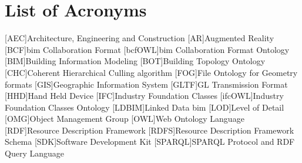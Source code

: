 \documentclass[12pt,a4paper,faculty=ea,language=en,doctype=report]{ugent-doc}
\renewcommand{\ULthickness}{2pt} %
\begin{document}
\maketitle
\renewcommand{\ULthickness}{1pt}

{\hypersetup{hidelinks}
  \tableofcontents
  \listoffigures
}

\newpage









% 
\clearpage
\chapter*{List of Acronyms}
\begin{acronym}[JSONP]\itemsep2pt\hypersetup{hidelinks}
  [AEC]{Architecture, Engineering and Construction}
  [AR]{Augmented Reality}
  [BCF]{\acs{bim} Collaboration Format}
  [bcfOWL]{\acs{bim} Collaboration Format Ontology}
  [BIM]{Building Information Modeling}
  [BOT]{Building Topology Ontology}
  [CHC]{Coherent Hierarchical Culling algorithm}
  [FOG]{File Ontology for Geometry formats}
  [GIS]{Geographic Information System}
  [GLTF]{GL Transmission Format}
  [HHD]{Hand Held Device}
  [IFC]{Industry Foundation Classes}
  [ifcOWL]{Industry Foundation Classes Ontology}
  [LDBIM]{Linked Data \acs{bim}}
  [LOD]{Level of Detail}
  [OMG]{Object Management Group}
  [OWL]{Web Ontology Language}
  [RDF]{Resource Description Framework}
  [RDFS]{Resource Description Framework Schema}
  [SDK]{Software Development Kit}
  [SPARQL]{SPARQL Protocol and RDF Query Language}
\end{acronym}

\printbibliography[heading=bibintoc,title={References}]
\end{document}
